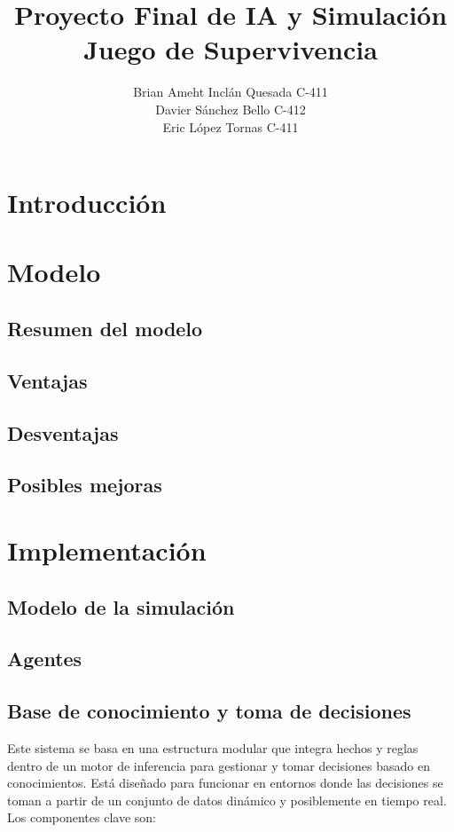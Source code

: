 \documentclass[11pt]{article}
\author{Brian Ameht Inclán Quesada C-411\\ Davier Sánchez Bello C-412\\ Eric López Tornas C-411}
\title{Proyecto Final de IA y Simulación \\ Juego de Supervivencia}
\date{}
\begin{document}
\maketitle
\newpage

\tableofcontents
\newpage

\section{Introducción}

\section{Modelo}
\subsection{Resumen del modelo}
\subsection{Ventajas}
\subsection{Desventajas}
\subsection{Posibles mejoras}


\section{Implementación}
\subsection{Modelo de la simulación}
\subsection{Agentes}
\subsection{Base de conocimiento y toma de decisiones}
Este sistema se basa en una estructura modular que integra hechos y reglas dentro de un motor de inferencia para gestionar y tomar decisiones basado en conocimientos. Está diseñado para funcionar en entornos donde las decisiones se toman a partir de un conjunto de datos dinámico y posiblemente en tiempo real. Los componentes clave son:
\end{document}
